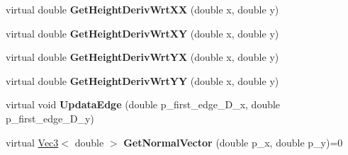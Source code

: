\begin{DoxyCompactItemize}
\item 
\mbox{\label{classquadruped_1_1Terrain_a568de4c587f00f23363ee45bf00f6c70}} 
virtual double {\bfseries Get\+Height\+Deriv\+Wrt\+XX} (double x, double y)
\item 
\mbox{\label{classquadruped_1_1Terrain_a0719f91623952c4edb689ba86789f443}} 
virtual double {\bfseries Get\+Height\+Deriv\+Wrt\+XY} (double x, double y)
\item 
\mbox{\label{classquadruped_1_1Terrain_a7084e067ce0466f009ae74450a0247ed}} 
virtual double {\bfseries Get\+Height\+Deriv\+Wrt\+YX} (double x, double y)
\item 
\mbox{\label{classquadruped_1_1Terrain_a8a9ef6d376b56d0f3a4a35716a553caf}} 
virtual double {\bfseries Get\+Height\+Deriv\+Wrt\+YY} (double x, double y)
\item 
\mbox{\label{classquadruped_1_1Terrain_a3cf3e2e194eabcd6917b1911fe66fac2}} 
virtual void {\bfseries Updata\+Edge} (double p\+\_\+first\+\_\+edge\+\_\+\+D\+\_\+x, double p\+\_\+first\+\_\+edge\+\_\+\+D\+\_\+y)
\item 
\mbox{\label{classquadruped_1_1Terrain_aa93648530b689a96eb46b37a0aa33b67}} 
virtual \hyperlink{cppTypes_8h_a65c27bf97693676535dd0b30ea0ad399}{Vec3}$<$ double $>$ {\bfseries Get\+Normal\+Vector} (double p\+\_\+x, double p\+\_\+y)=0
\end{DoxyCompactItemize}
